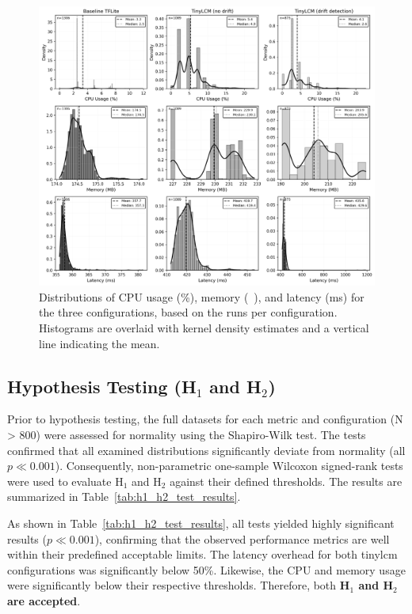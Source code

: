 \begin{figure}[htbp]
  \centering
  \includegraphics[width=.98\linewidth]{figs/evaluation/histograms_density_N5.png}
  \caption[Histograms and Kernel Density Estimates of Aggregated Performance Metrics]{Distributions of CPU usage (\%), memory (\si{\mega\byte}), and latency (\si{\milli\second}) for the three configurations, based on the runs per configuration. Histograms are overlaid with kernel density estimates and a vertical line indicating the mean.}
  \label{fig:performance_histograms_density_eval}
\end{figure}

\subsection{Hypothesis Testing (H$_1$ and H$_2$)}
\label{ssec:phase1_hyp_tests}

Prior to hypothesis testing, the full datasets for each metric and configuration (N > 800) were assessed for normality using the Shapiro-Wilk test. The tests confirmed that all examined distributions significantly deviate from normality (all $p \ll 0.001$). Consequently, non-parametric one-sample Wilcoxon signed-rank tests were used to evaluate H$_1$ and H$_2$ against their defined thresholds. The results are summarized in Table~\ref{tab:h1_h2_test_results}.

As shown in Table~\ref{tab:h1_h2_test_results}, all tests yielded highly significant results ($p \ll 0.001$), confirming that the observed performance metrics are well within their predefined acceptable limits. The latency overhead for both \gls{tinylcm} configurations was significantly below 50\%. Likewise, the CPU and memory usage were significantly below their respective thresholds. Therefore, both \textbf{H$_1$ and H$_2$ are accepted}.

